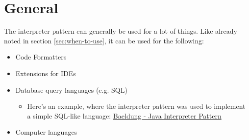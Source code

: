 \section{General}

The interpreter pattern can generally be used for a lot of things. Like already noted in section \ref{sec:when-to-use}, it can be used for the following: 

\begin{itemize}
    \item Code Formatters
    \item Extensions for IDEs
    \item Database query languages (e.g. SQL)

    \begin{itemize}
        \item Here's an example, where the interpreter pattern was used to implement a simple SQL-like language: \href{https://github.com/eugenp/tutorials/tree/master/patterns/design-patterns-behavioral}{Baeldung - Java Interpreter Pattern}
    \end{itemize}

    \item Computer languages
\end{itemize}
